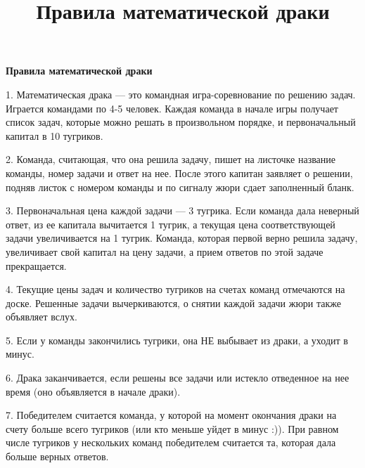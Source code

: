 \centerline{\bf \Huge  Правила математической драки}
\title{Правила математической драки}

1. Математическая драка — это командная игра-соревнование по решению задач. Играется командами по 4-5 человек. Каждая команда в начале игры получает список задач, которые можно решать в произвольном порядке, и первоначальный капитал в 10 тугриков.

2. Команда, считающая, что она решила задачу, пишет на листочке название команды, номер задачи и ответ на нее. После этого капитан заявляет о решении, подняв листок с номером команды и по сигналу жюри сдает заполненный бланк.

3. Первоначальная цена каждой задачи — 3 тугрика. Если команда дала неверный ответ, из ее капитала вычитается 1 тугрик, а текущая цена соответствующей задачи увеличивается на 1 тугрик. Команда, которая первой верно решила задачу, увеличивает свой капитал на цену задачи, а прием ответов по этой задаче прекращается.

4. Текущие цены задач и количество тугриков на счетах команд отмечаются на доске. Решенные задачи вычеркиваются, о снятии каждой задачи жюри также объявляет вслух.

5. Если у команды закончились тугрики, она НЕ выбывает из драки, а уходит в минус.

6. Драка заканчивается, если решены все задачи или истекло отведенное на нее время (оно объявляется в начале драки).

7. Победителем считается команда, у которой на момент окончания драки на счету больше всего тугриков (или кто меньше уйдет в минус :)). При равном числе тугриков у нескольких команд победителем считается та, которая дала больше верных ответов.